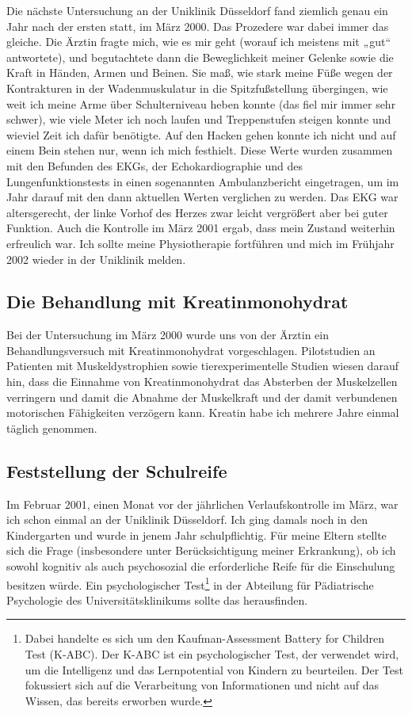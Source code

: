 \documentclass[fontsize=14pt,a4paper,headinclude,DIV=calc,automark]{scrbook}
\begin{document}
Die nächste Untersuchung an der Uniklinik Düsseldorf fand ziemlich genau ein Jahr nach der ersten statt, im März 2000. Das Prozedere war dabei immer das gleiche. Die Ärztin fragte mich, wie es mir geht (worauf ich meistens mit „gut“ antwortete), und begutachtete dann die Beweglichkeit meiner Gelenke sowie die Kraft in Händen, Armen und Beinen. Sie maß, wie stark meine Füße wegen der Kontrakturen in der Wadenmuskulatur in die Spitzfußstellung übergingen, wie weit ich meine Arme über Schulterniveau heben konnte (das fiel mir immer sehr schwer), wie viele Meter ich noch laufen und Treppenstufen steigen konnte und wieviel Zeit ich dafür benötigte. Auf den Hacken gehen konnte ich nicht und auf einem Bein stehen nur, wenn ich mich festhielt. Diese Werte wurden zusammen mit den Befunden des EKGs, der Echokardiographie und des Lungenfunktionstests in einen sogenannten Ambulanzbericht eingetragen, um im Jahr darauf mit den dann aktuellen Werten verglichen zu werden. Das EKG war altersgerecht, der linke Vorhof des Herzes zwar leicht vergrößert aber bei guter Funktion. Auch die Kontrolle im März 2001 ergab, dass mein Zustand weiterhin erfreulich war. Ich sollte meine Physiotherapie fortführen und mich im Frühjahr 2002 wieder in der Uniklinik melden.

\subsection{Die Behandlung mit Kreatinmonohydrat}

Bei der Untersuchung im März 2000 wurde uns von der Ärztin ein Behandlungsversuch mit Kreatinmonohydrat vorgeschlagen. Pilotstudien an Patienten mit Muskeldystrophien sowie tierexperimentelle Studien wiesen darauf hin, dass die Einnahme von Kreatinmonohydrat das Absterben der Muskelzellen verringern und damit die Abnahme der Muskelkraft und der damit verbundenen motorischen Fähigkeiten verzögern kann. Kreatin habe ich mehrere Jahre einmal täglich genommen.

\subsection{Feststellung der Schulreife}

Im Februar 2001, einen Monat vor der jährlichen Verlaufskontrolle im März, war ich schon einmal an der Uniklinik Düsseldorf. Ich ging damals noch in den Kindergarten und wurde in jenem Jahr schulpflichtig. Für meine Eltern stellte sich die Frage (insbesondere unter Berücksichtigung meiner Erkrankung), ob ich sowohl kognitiv als auch psychosozial die erforderliche Reife für die Einschulung besitzen würde. Ein psychologischer Test\footnote{Dabei handelte es sich um den Kaufman-Assessment Battery for Children Test (K-ABC). Der K-ABC ist ein psychologischer Test, der verwendet wird, um die Intelligenz und das Lernpotential von Kindern zu beurteilen. Der Test fokussiert sich auf die Verarbeitung von Informationen und nicht auf das Wissen, das bereits erworben wurde.} in der Abteilung für Pädiatrische Psychologie des Universitätsklinikums sollte das herausfinden.
\end{document}
